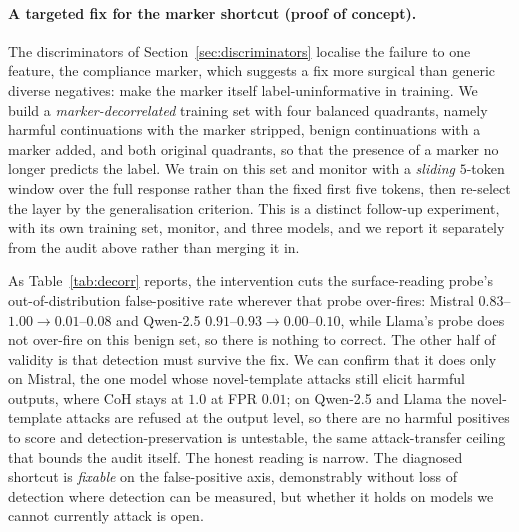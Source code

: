 \documentclass{article}
\begin{document}
\paragraph{A targeted fix for the marker shortcut (proof of concept).}
The discriminators of Section~\ref{sec:discriminators} localise the failure to one feature, the compliance marker, which suggests a fix more surgical than generic diverse negatives: make the marker itself label-uninformative in training. We build a \emph{marker-decorrelated} training set with four balanced quadrants, namely harmful continuations with the marker stripped, benign continuations with a marker added, and both original quadrants, so that the presence of a marker no longer predicts the label. We train on this set and monitor with a \emph{sliding} $5$-token window over the full response rather than the fixed first five tokens, then re-select the layer by the generalisation criterion. This is a distinct follow-up experiment, with its own training set, monitor, and three models, and we report it separately from the audit above rather than merging it in.

As Table~\ref{tab:decorr} reports, the intervention cuts the surface-reading probe's out-of-distribution false-positive rate wherever that probe over-fires: Mistral $0.83$--$1.00 \to 0.01$--$0.08$ and Qwen-2.5 $0.91$--$0.93 \to 0.00$--$0.10$, while Llama's probe does not over-fire on this benign set, so there is nothing to correct. The other half of validity is that detection must survive the fix. We can confirm that it does only on Mistral, the one model whose novel-template attacks still elicit harmful outputs, where CoH stays at $1.0$ at FPR $0.01$; on Qwen-2.5 and Llama the novel-template attacks are refused at the output level, so there are no harmful positives to score and detection-preservation is untestable, the same attack-transfer ceiling that bounds the audit itself. The honest reading is narrow. The diagnosed shortcut is \emph{fixable} on the false-positive axis, demonstrably without loss of detection where detection can be measured, but whether it holds on models we cannot currently attack is open.
\end{document}
